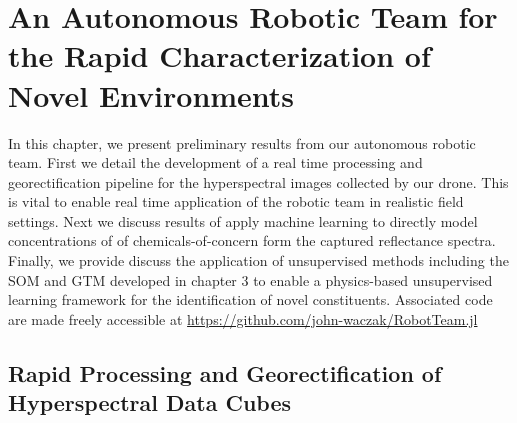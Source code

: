 \chapter{An Autonomous Robotic Team for the Rapid Characterization of Novel Environments}

In this chapter, we present preliminary results from our autonomous robotic team. First we detail the development of a real time processing and georectification pipeline for the hyperspectral images collected by our drone. This is vital to enable real time application of the robotic team in realistic field settings. Next we discuss results of apply machine learning to directly model concentrations of of chemicals-of-concern form the captured reflectance spectra. Finally, we provide discuss the application of unsupervised methods including the SOM and GTM developed in chapter 3 to enable a physics-based unsupervised learning framework for the identification of novel constituents. Associated code are made freely accessible at \url{https://github.com/john-waczak/RobotTeam.jl}

\section{Rapid Processing and Georectification of Hyperspectral Data Cubes}

